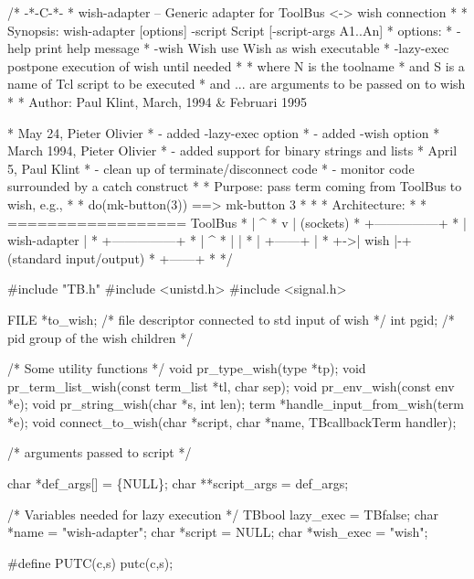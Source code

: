 \endmoddef\let\nwnotused=\nwoutput{}\nwstartdeflinemarkup\nwenddeflinemarkup
/* -*-C-*-
 * wish-adapter -- Generic adapter for ToolBus <-> wish connection
 *
 * Synopsis: wish-adapter [options] -script Script [-script-args A1..An]
 * options:
 *      -help                 print help message
 *      -wish Wish            use Wish as wish executable
 *      -lazy-exec            postpone execution of wish until needed
 *
 * where N is the toolname
 * and   S is a name of Tcl script to be executed
 * and   ... are arguments to be passed on to wish
 *
 * Author: Paul Klint, March, 1994 & Februari 1995

 * May 24, Pieter Olivier
 * - added -lazy-exec option
 * - added -wish option
 * March 1994, Pieter Olivier
 * - added support for binary strings and lists
 * April 5, Paul Klint
 * - clean up of terminate/disconnect code
 * - monitor code surrounded by a catch construct
 *
 * Purpose: pass term coming from ToolBus to wish, e.g.,
 *
 *    do(mk-button(3))  ==> mk-button 3
 *
 *
 * Architecture:
 *
 *         ================== ToolBus
 *           |           ^
 *           v           |    (sockets)
 *         +---------------+
 *         | wish-adapter  |
 *         +---------------+
 *           |           ^
 *           |           |
 *           |  +------+ |
 *           +->| wish |-+    (standard input/output)
 *              +------+
 *
 */

#include "TB.h"
#include <unistd.h>
#include <signal.h>

FILE *to_wish;  /* file descriptor connected to std input of wish */
int pgid;       /* pid group of the wish children */

/* Some utility functions */
void pr_type_wish(type *tp);
void pr_term_list_wish(const term_list *tl, char sep);
void pr_env_wish(const env *e);
void pr_string_wish(char *s, int len);
term *handle_input_from_wish(term *e);
void connect_to_wish(char *script, char *name, TBcallbackTerm handler);

/* arguments passed to script */

char *def_args[] = \{NULL\};
char **script_args = def_args;

/* Variables needed for lazy execution */
TBbool lazy_exec = TBfalse;
char *name = "wish-adapter";
char *script = NULL;
char *wish_exec = "wish";

#define PUTC(c,s) putc(c,s);


